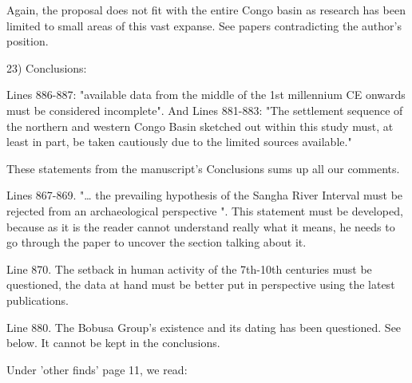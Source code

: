 \begin{reviewer}
Again, the proposal does not fit with the entire Congo basin as research has been limited to small areas of this vast expanse. See papers contradicting the author's position.


23) Conclusions:

\point Lines 886-887: "available data from the middle of the 1st millennium CE onwards must be considered incomplete".
And
Lines 881-883: "The settlement sequence of the northern and western Congo Basin sketched out within this study must, at least in part, be taken cautiously due to the limited sources available."

These statements from the manuscript's Conclusions sums up all our comments.

\point Lines 867-869. "… the prevailing hypothesis of the Sangha River Interval must be rejected from an archaeological perspective ". This statement must be developed, because as it is the reader cannot understand really what it means, he needs to go through the paper to uncover the section talking about it.


\point Line 870. The setback in human activity of the 7th-10th centuries must be questioned, the data at hand must be better put in perspective using the latest publications.


\point Line 880. The Bobusa Group's existence and its dating has been questioned. See below. It cannot be kept in the conclusions.


\point Under 'other finds' page 11, we read:


\end{reviewer}
